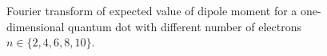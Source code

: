 \begin{figure}
    \centering
    \caption{Fourier transform of expected value of dipole moment for 
        a one-dimensional quantum dot with different number of electrons
        $n\in\{2,4,6,8,10\}$.
    }
    \label{}
\end{figure}
